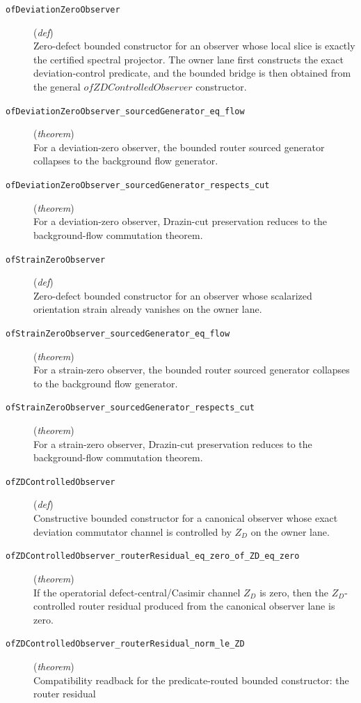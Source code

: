 \documentclass[11pt,a4paper]{article}
\begin{document}
\begin{description}
  \item[\texttt{ofDeviationZeroObserver}] (\textit{def}) \\ Zero-defect bounded constructor for an observer whose local slice is exactly the 
certified spectral projector.  The owner lane first constructs the exact 
deviation-control predicate, and the bounded bridge is then obtained from the 
general $ofZDControlledObserver$ constructor.
  \item[\texttt{ofDeviationZeroObserver\_sourcedGenerator\_eq\_flow}] (\textit{theorem}) \\ For a deviation-zero observer, the bounded router sourced generator collapses to 
the background flow generator.
  \item[\texttt{ofDeviationZeroObserver\_sourcedGenerator\_respects\_cut}] (\textit{theorem}) \\ For a deviation-zero observer, Drazin-cut preservation reduces to the 
background-flow commutation theorem.
  \item[\texttt{ofStrainZeroObserver}] (\textit{def}) \\ Zero-defect bounded constructor for an observer whose scalarized orientation 
strain already vanishes on the owner lane.
  \item[\texttt{ofStrainZeroObserver\_sourcedGenerator\_eq\_flow}] (\textit{theorem}) \\ For a strain-zero observer, the bounded router sourced generator collapses to the 
background flow generator.
  \item[\texttt{ofStrainZeroObserver\_sourcedGenerator\_respects\_cut}] (\textit{theorem}) \\ For a strain-zero observer, Drazin-cut preservation reduces to the 
background-flow commutation theorem.
  \item[\texttt{ofZDControlledObserver}] (\textit{def}) \\ Constructive bounded constructor for a canonical observer whose exact deviation 
commutator channel is controlled by $Z_D$ on the owner lane.
  \item[\texttt{ofZDControlledObserver\_routerResidual\_eq\_zero\_of\_ZD\_eq\_zero}] (\textit{theorem}) \\ If the operatorial defect-central/Casimir channel $Z_D$ is zero, then the 
$Z_D$-controlled router residual produced from the canonical observer lane is 
zero.
  \item[\texttt{ofZDControlledObserver\_routerResidual\_norm\_le\_ZD}] (\textit{theorem}) \\ Compatibility readback for the predicate-routed bounded constructor: the router residual 

\end{description}
\end{document}
